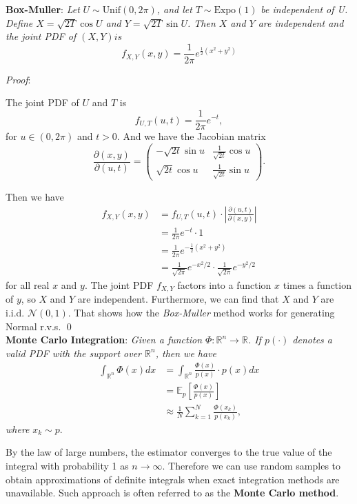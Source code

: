 \documentclass{progartcn}
\begin{document}
		\textbf{Box-Muller}: \textit{Let }$U\sim\text{Unif}(0,2\pi)$\textit{, and let }$T\sim\text{Expo}(1)$\textit{ be independent of U. Define $X=\sqrt{2T}\cos U$ and $Y=\sqrt{2T}\sin U$. Then $X$ and $Y$ are independent and the joint PDF of $(X,Y) is$}
		\[f_{X,Y}(x,y)=\frac{1}{2\pi}e^{\frac{1}{2}(x^2+y^2)}\]

		\textit{Proof}:

		The joint PDF of $U$ and $T$ is
		\[f_{U,T}(u,t)=\frac{1}{2\pi}e^{-t},\]
		for $u\in(0,2\pi)$ and $t>0$. And we have the Jacobian matrix
		\[\frac{\partial(x,y)}{\partial(u,t)} = 
		\begin{pmatrix}
		-\sqrt{2t}\sin u & \frac{1}{\sqrt{2t}}\cos u\\
		\sqrt{2t}\cos u & \frac{1}{\sqrt{2t}} \sin u
		\end{pmatrix}.\]

		Then we have
		\[\begin{split}
		f_{X,Y}(x,y)&=f_{U,T}(u,t)\cdot \left\vert \frac{\partial(u,t)}{\partial(x,y)}\right\vert\\
		&=\frac{1}{2\pi}e^{-t}\cdot 1\\
		&=\frac{1}{2\pi}e^{-\frac{1}{2}(x^2+y^2)}\\
		&=\frac{1}{\sqrt{2\pi}}e^{-x^2\slash 2}\cdot \frac{1}{\sqrt{2\pi}}e^{-y^2\slash 2}
		\end{split}
		\]
		for all real $x$ and $y$. The joint PDF $f_{X,Y}$ factors into a function $x$ times a function of $y$, so $X$ and $Y$ are independent. Furthermore, we can find that $X$ and $Y$ are i.i.d. $\mathcal{N}(0,1)$. That shows how the \textit{Box-Muller} method works for generating Normal r.v.s.
		\qed\\

		\textbf{Monte Carlo Integration}: \textit{Given a function $\Phi:\mathbb{R}^n\to \mathbb{R}$. If $p(\cdot)$ denotes a valid PDF with the support over $\mathbb{R}^n$, then we have}
		\[
		\begin{split}
		\int_{\mathbb{R}^n}\Phi(x)dx&=\int_{\mathbb{R}^n} \frac{\Phi(x)}{p(x)}\cdot p(x)dx\\
		&=\mathbb{E}_p\left [\frac{\Phi(x)}{p(x)}\right ]\\
		&\approx \frac{1}{N}\sum_{k=1}^N \frac{\Phi(x_k)}{p(x_k)},
		\end{split}
		\label{eq_monte_carlo_int}
		\]
		\textit{where} $x_k\sim p$. 

		By the law of large numbers, the estimator converges to the true value of the integral with probability 1 as $n\to\infty$. Therefore we can use random samples to obtain approximations of definite integrals when exact integration methods are unavailable. Such approach is often referred to as the \textbf{Monte Carlo method}.\\
\end{document}
